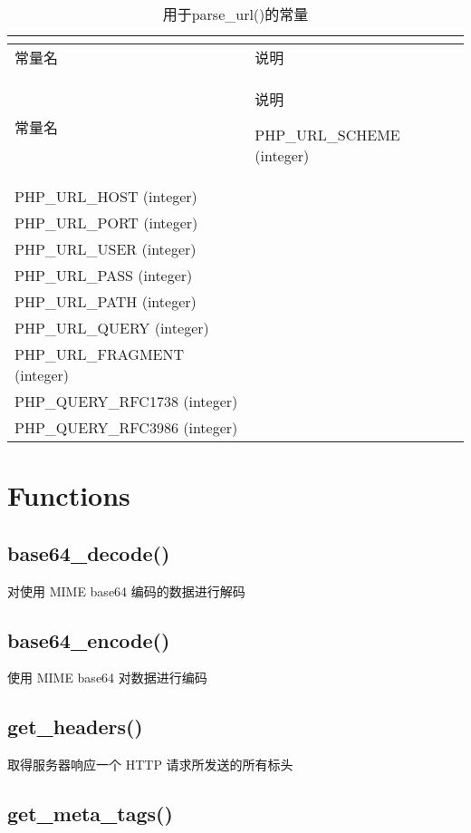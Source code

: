 \begin{longtable}{|m{100pt}|m{200pt}|}
\multicolumn{2}{r}{}
\tabularnewline\hline
常量名&说明
\endhead

\caption{用于parse\_url()的常量}\\
\hline
常量名&说明
\endfirsthead

\multicolumn{2}{r}{}
\endfoot

\endlastfoot
\hline
PHP\_URL\_SCHEME (integer)&\\
\hline
PHP\_URL\_HOST (integer)\\
\hline
PHP\_URL\_PORT (integer)\\
\hline
PHP\_URL\_USER (integer)\\
\hline
PHP\_URL\_PASS (integer)\\
\hline
PHP\_URL\_PATH (integer)\\
\hline
PHP\_URL\_QUERY (integer)\\
\hline
PHP\_URL\_FRAGMENT (integer)\\
\hline
PHP\_QUERY\_RFC1738 (integer)\\
\hline
PHP\_QUERY\_RFC3986 (integer)\\
\hline
\end{longtable}



\chapter{Functions}


\section{base64\_decode()}

对使用 MIME base64 编码的数据进行解码

\section{base64\_encode()}

使用 MIME base64 对数据进行编码

\section{get\_headers()}

取得服务器响应一个 HTTP 请求所发送的所有标头

\section{get\_meta\_tags()}

